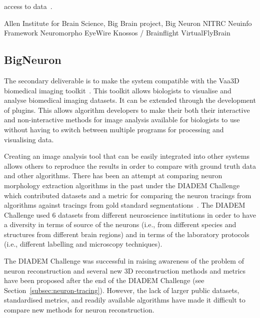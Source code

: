 access to data~\autocite{NeuroMorphVariability:Parekh:2015,Poldrack2011}.

Allen Institute for Brain Science,
Big Brain project,
Big Neuron
NITRC
Neuinfo  Framework
Neuromorpho
EyeWire
Knossos / Brainflight
VirtualFlyBrain
~\autocite{NeuroDebian:Halchenko:2012}

\subsection{BigNeuron}\label{subsec:bigneuron}

{ %
	The secondary deliverable is to make the system compatible
	with the Vaa3D biomedical imaging toolkit~\autocite{Vaa3D:site:2015,Vaa3D:Peng:2010,Vaa3D:Peng:2014}.
	This toolkit allows biologists to visualise and analyse
	biomedical imaging datasets. It can be extended through
	the development of plugins. This allows algorithm
	developers to make their both their interactive and
	non-interactive methods for image analysis available
	for biologists to use without having to switch between
	multiple programs for processing and visualising data.
}

Creating an image analysis tool that can be easily integrated into
other systems allows others to reproduce the results in order to
compare with ground truth data and other algorithms. There
has been an attempt at comparing neuron morphology extraction
algorithms in the past under the DIADEM Challenge which
contributed datasets and a metric for comparing the neuron
tracings from algorithms against tracings from gold standard
segmentations~\autocite{DIADEM&Beyond:Liu:2011,DIADEM-dataset:Brown:2011,DIADEM-metric-Gillette2011}.
The DIADEM Challenge used 6 datasets from different neuroscience
institutions in order to have a diversity in terms of source of
the neurons (i.e., from different species and structures from
different brain regions) and in terms of the laboratory protocols
(i.e., different labelling and microscopy techniques).

The DIADEM Challenge was successful in raising awareness of the
problem of neuron reconstruction and several new 3D reconstruction
methods and metrics have been proposed after the end of the DIADEM
Challenge (see Section~\ref{subsec:neuron-tracing}).  However, the
lack of larger public datasets, standardised metrics, and readily
available algorithms have made it difficult to compare new methods
for neuron reconstruction.

